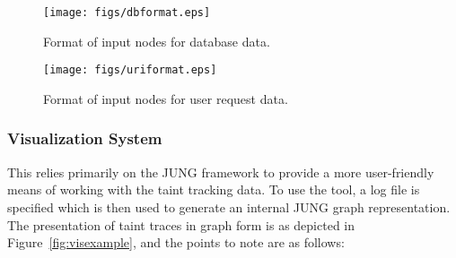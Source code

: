 \documentclass[msc,oneside]{ubcthesis}
\begin{document}
\begin{figure}[ht]
  \begin{center}
    \texttt{[image: figs/dbformat.eps]}
    \caption[Format of input nodes for database data.]{\label{fig:dbformat} Format of input nodes for database data.}
  \end{center}
\end{figure}

\begin{figure}[ht]
  \begin{center}
    \texttt{[image: figs/uriformat.eps]}
    \caption[Format of input nodes for user request data.]{\label{fig:uriformat} Format of input nodes for user request data.}
  \end{center}
\end{figure}

\subsubsection{Visualization System} 
\label{subsub:vissystem}
This relies primarily on the JUNG framework to provide a more user-friendly means of working with the taint tracking data. To use the tool, a log file is specified which is then used to generate an internal JUNG graph representation. The presentation of taint traces in graph form is as depicted in Figure~\ref{fig:visexample}, and the points to note are as follows:
\end{document}
